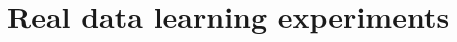 \documentclass{article}
\theoremstyle{plain}
\theoremstyle{definition}
\theoremstyle{remark}
\begin{document}
%     
%     
%     
%     
%     
  

\section{Real data learning experiments}
\end{document}
